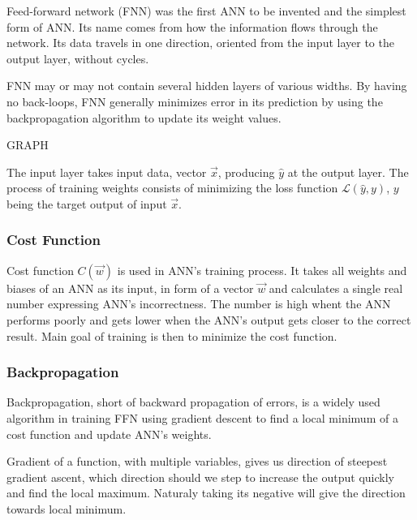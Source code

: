 Feed-forward network (FNN) was the first ANN to be invented and the simplest form of ANN. Its name comes from how the information flows through the network. Its data travels in one direction, oriented from the input layer to the output layer, without cycles.\cite{ffnbrilliant} 

FNN may or may not contain several hidden layers of various widths. By having no back-loops, FNN generally minimizes error in its prediction by using the backpropagation algorithm to update its weight values.\cite{mainTypesANN}

GRAPH

The input layer takes input data, vector $\vec{x}$, producing $\hat{y}$ at the output layer. The process of training weights
 consists of minimizing the loss function $\mathcal{L}(\hat{y},y)$, $y$ being the target output of input $\vec{x}$.\cite{lipton2015critical}


\subsubsection{Cost Function}
Cost function $C(\vec{w})$ is used in ANN's training process. It takes all weights and biases of an ANN as its input, in form of a vector $\vec{w}$ and calculates a single real number expressing ANN's incorrectness.\cite{Goodfellow-et-al-2016} The number is high whent the ANN performs poorly and gets lower when the ANN's output gets closer to the correct result. Main goal of training is then to minimize the cost function. 

\subsubsection{Backpropagation}
Backpropagation, short of backward propagation of errors, is a widely used algorithm in training FFN using gradient descent to find a local minimum of a cost function and update ANN's weights.\cite{birlliantbackprop}

Gradient of a function, with multiple variables, gives us direction of steepest gradient ascent, which direction should we step to increase the output quickly and find the local maximum. Naturaly taking its negative will give the direction towards local minimum. 

